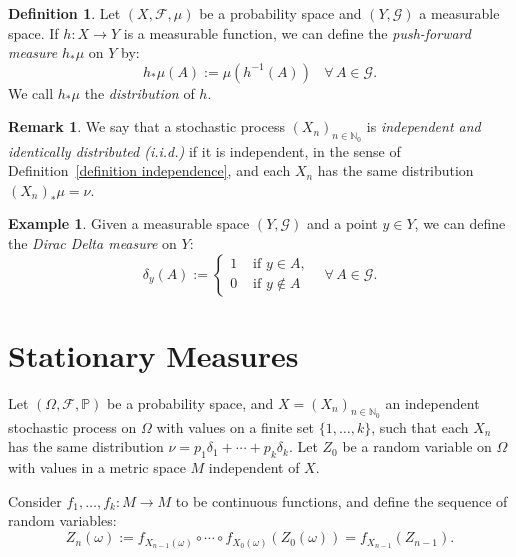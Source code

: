 \documentclass[a4paper]{article}
\theoremstyle{plain}
\theoremstyle{definition}
\newtheorem{defn}[theorem]{Definition}%
\newtheorem{rem}[theorem]{Remark}
\newtheorem{example} [theorem]{Example}
\newcommand{\N}{\mathbb{N}}
\begin{document}
    \begin{defn}
        Let $(X,\mathcal{F},\mu)$ be a probability space and $(Y,\mathcal{G})$ a measurable space. If $h: X \to Y$ is a measurable function, we can define the \textit{push-forward measure} $h_{*}\mu$ on $Y$ by:
        \begin{equation*}
            h_{*}\mu(A) := \mu(h^{-1}(A)) ~~~~ \forall\, A \in \mathcal{G}.
        \end{equation*}
        We call $h_{*}\mu$ the \textit{distribution} of $h$.
    \end{defn}

    \begin{rem}
        We say that a stochastic process $(X_{n})_{n\in\N_{0}}$ is \textit{independent and identically distributed (i.i.d.)} if it is independent, in the sense of Definition~\ref{definition independence}, and each $X_{n}$ has the same distribution $(X_{n})_{*}\mu = \nu$.
    \end{rem}

    \begin{example}
        Given a measurable space $(Y,\mathcal{G})$ and a point $y \in Y$, we can define the \textit{Dirac Delta measure} on $Y$:
        \begin{equation*}
            \delta_{y}(A) := \left\{\begin{array}{ll}
                 1 & \text{ if } y \in A, \\
                 0 & \text{ if } y \not\in A
            \end{array}\right. ~~~~ \forall\, A \in \mathcal{G}.
        \end{equation*}
    \end{example}
 
		
	
	\section{Stationary Measures}
	
	Let $(\Omega, \mathcal{F}, \mathbb{P})$ be a probability space, and $X = (X_{n})_{n\in\N_{0}}$ an independent stochastic process on $\Omega$ with values on a finite set $\{1,\dots,k\}$, such that each $X_{n}$ has the same distribution $\nu = p_{1}\delta_{1} + \cdots + p_{k}\delta_{k}$. Let $Z_{0}$ be a random variable on $\Omega$ with values in a metric space $M$ independent of $X$.
	
	Consider $f_{1},\dots, f_{k}: M \to M$ to be continuous functions, and define the sequence of random variables:
	\begin{equation*}
		Z_{n}(\omega) := f_{X_{n-1}(\omega)}\circ \cdots \circ f_{X_{0}(\omega)}(Z_{0}(\omega)) = f_{X_{n-1}}(Z_{n-1}).
	\end{equation*}
\end{document}
